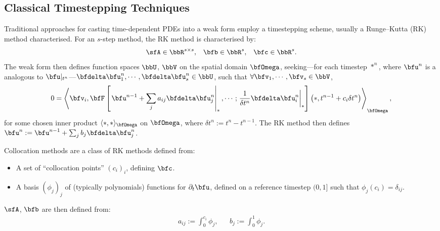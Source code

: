 \subsection*{Classical Timestepping Techniques}
    Traditional approaches for casting time-dependent PDEs into a weak form employ a timestepping scheme, usually a Runge–Kutta (RK) method characterised. For an $s$-step method, the RK method is characterised by:
    \begin{align}
        \sfA  \in  \bbR^{s \times s},  &&
        \bfb  \in  \bbR^{s},  &&
        \bfc  \in  \bbR^{s}.
    \end{align}
    The weak form then defines function spaces $\bbU$, $\bbV$ on the spatial domain $\bfOmega$, seeking—for each timestep $*^{n}$, where $\bfu^{n}$ is a analogous to $\bfu|_{t^{n}}$—$\bfdelta\bfu^{n}_{1}, \cdots, \bfdelta\bfu^{n}_{s}  \in  \bbU$, such that $\forall  \bfv_{1}, \cdots, \bfv_{s}  \in  \bbV$,
    \begin{equation}
        0  =  \left\langle\bfv_{i}, \bfF\left[\left.\bfu^{n - 1} + \sum_{j}a_{ij}\bfdelta\bfu^{n}_{j}\right|_{*}, \cdots; \left.\frac{1}{\delta t^{n}}\bfdelta\bfu^{n}_{i}\right|_{*}\right]\left(*, t^{n - 1} + c_{i}\delta t^{n}\right)\right\rangle_{\bfOmega},
    \end{equation}
    for some chosen inner product $\langle*, *\rangle_{\bfOmega}$ on $\bfOmega$, where $\delta t^{n}  :=  t^{n} - t^{n - 1}$. The RK method then defines $\bfu^{n}  :=  \bfu^{n - 1} + \sum_{j}b_{j}\bfdelta\bfu^{n}_{j}$.

    \line
    \begin{definition}
        Collocation methods are a class of RK methods defined from:
        \begin{itemize}
            \item  A set of ``collocation points'' $(c_{i})_{i}$, defining $\bfc$.
            \item  A basis $(\phi_{j})_{j}$ of (typically polynomials) functions for $\partial_{t}\bfu$, defined on a reference timestep $(0, 1]$ such that $\phi_{j}(c_{i})  =  \delta_{ij}$.
        \end{itemize}
        $\sfA$, $\bfb$ are then defined from:
        \begin{align}
            a_{ij}  :=  \int_{0}^{c_{i}}\phi_{j},  &&
            b_{j}   :=  \int_{0}^{1}\phi_{j}.
        \end{align}
    \end{definition}
    
